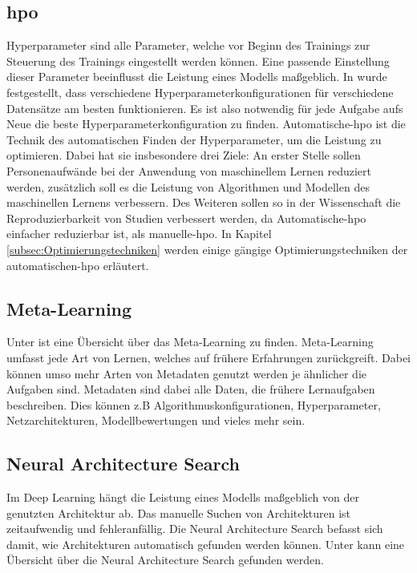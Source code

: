 	\subsection{\acl{hpo}}
	\label{subsec:HyperparameterOptimierung}	
	Hyperparameter sind alle Parameter, welche vor Beginn des Trainings zur Steuerung des Trainings eingestellt werden können. Eine passende Einstellung dieser Parameter beeinflusst die Leistung eines Modells maßgeblich. In \cite{Kohavi.1995} wurde festgestellt, dass verschiedene Hyperparameterkonfigurationen für verschiedene Datensätze am besten funktionieren. Es ist also notwendig für jede Aufgabe aufs Neue die beste Hyperparameterkonfiguration zu finden.      
	Automatische-\ac{hpo} ist die Technik des automatischen Finden der Hyperparameter, um die Leistung zu optimieren. Dabei hat sie insbesondere drei Ziele: An erster Stelle sollen Personenaufwände bei der Anwendung von maschinellem Lernen reduziert werden, zusätzlich soll es die Leistung von Algorithmen und Modellen des maschinellen Lernens verbessern. Des Weiteren sollen so in der Wissenschaft die Reproduzierbarkeit von Studien verbessert werden, da Automatische-\ac{hpo} einfacher reduzierbar ist, als manuelle-\ac{hpo}. In Kapitel \ref{subsec:Optimierungstechniken} werden einige gängige Optimierungstechniken der automatischen-\ac{hpo} erläutert.  
	\cite{Feurer.2019}		
	
	
	\subsection{Meta-Learning}
	\label{subsec:MetaLearning}
	Unter \cite{JoaquinVanschoren.2018} ist eine Übersicht über das Meta-Learning zu finden. Meta-Learning umfasst jede Art von Lernen, welches auf frühere Erfahrungen zurückgreift. Dabei können umso mehr Arten von Metadaten genutzt werden je ähnlicher die Aufgaben sind. Metadaten sind dabei alle Daten, die frühere Lernaufgaben beschreiben. Dies können z.B Algorithmuskonfigurationen, Hyperparameter, Netzarchitekturen, Modellbewertungen und vieles mehr sein.
	
	\subsection{Neural Architecture Search}
	\label{subsec:NeuralArchitectureSearch}
	Im Deep Learning hängt die Leistung eines Modells maßgeblich von der genutzten Architektur ab. Das manuelle Suchen von Architekturen ist zeitaufwendig und fehleranfällig. Die Neural Architecture Search befasst sich damit, wie Architekturen automatisch gefunden werden können. Unter \cite{Elsken.2019} kann eine Übersicht über die Neural Architecture Search gefunden werden. 	

